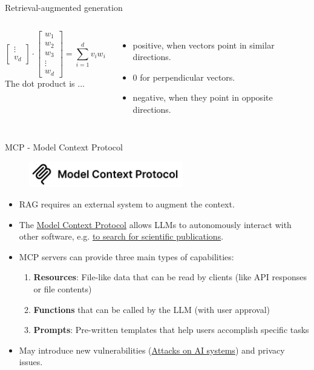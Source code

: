 \documentclass[10pt]{beamer}
\newcommand{\feature}[1]{{\color{scLime} \textbf{#1}}}
\begin{document}
\begin{frame}{Retrieval-augmented generation}
\begin{columns}[T,onlytextwidth]
$$\begin{bmatrix}
			\vdots \\
			v_d
		\end{bmatrix}
		\cdot
		\begin{bmatrix}
			w_1 \\
			w_2 \\
			w_3 \\
			\vdots \\
			w_d
		\end{bmatrix}
	    = \sum_{i=1}^{d} v_i w_i
		$$
		\vspace{0.1cm}
		The dot product is ...
				\begin{itemize}
			\item positive, when vectors point in similar directions. 
			\item 0 for perpendicular vectors.
			\item negative, when they point in opposite directions.
		\end{itemize}
	\end{columns}
\end{frame}


\begin{frame}{MCP - Model Context Protocol}
	\begin{figure}
		\includegraphics[width=0.6\textwidth]{figures/ModelContextProtocol.png}
	\end{figure}
	\begin{itemize}
		\item RAG requires an external system to augment the context.
		\item The \href{https://modelcontextprotocol.io/introduction}{Model Context Protocol} allows LLMs to autonomously interact with other software, e.g. \href{https://github.com/grll/pubmedmcp}{to search for scientific publications}.
		\item MCP servers can provide three main types of capabilities:
		\begin{enumerate}
			\item \feature{Resources}: File-like data that can be read by clients (like API responses or file contents)
			\item  \feature{Functions} that can be called by the LLM (with user approval)
			\item \feature{Prompts}: Pre-written templates that help users accomplish specific tasks
		\end{enumerate}
		\item May introduce new vulnerabilities (\href{https://github.com/twosixlabs/armory-library}{Attacks on AI systems}) and privacy issues.
\end{itemize}
\end{frame}
\end{document}
